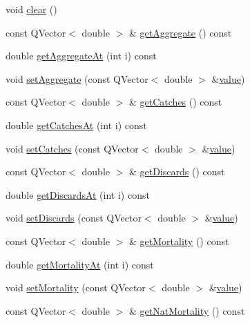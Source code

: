 \begin{DoxyCompactItemize}
\item 
void \mbox{\hyperlink{class_population_data_a37293ee09cf8bad0702f0ab9a16119aa}{clear}} ()
\item 
const Q\+Vector$<$ double $>$ \& \mbox{\hyperlink{class_population_data_ad9a26b5244fa9a093ed7ef7127b6dd5b}{get\+Aggregate}} () const
\item 
double \mbox{\hyperlink{class_population_data_aa40d72ba5f1d6729d1eff55a39961493}{get\+Aggregate\+At}} (int i) const
\item 
void \mbox{\hyperlink{class_population_data_ae4564a189ea27190e5437ea1bd8a9dcb}{set\+Aggregate}} (const Q\+Vector$<$ double $>$ \&\mbox{\hyperlink{diffusion_8cpp_a4b41795815d9f3d03abfc739e666d5da}{value}})
\item 
const Q\+Vector$<$ double $>$ \& \mbox{\hyperlink{class_population_data_a7ef29dd6225298f9d68b8e58f3463313}{get\+Catches}} () const
\item 
double \mbox{\hyperlink{class_population_data_aa79ab667768a1a78049251a01f8af5eb}{get\+Catches\+At}} (int i) const
\item 
void \mbox{\hyperlink{class_population_data_a04cd2bba84aa9b7d94d1fb959124fa17}{set\+Catches}} (const Q\+Vector$<$ double $>$ \&\mbox{\hyperlink{diffusion_8cpp_a4b41795815d9f3d03abfc739e666d5da}{value}})
\item 
const Q\+Vector$<$ double $>$ \& \mbox{\hyperlink{class_population_data_a99700b0eb7d8724af631d923bccd8973}{get\+Discards}} () const
\item 
double \mbox{\hyperlink{class_population_data_a2ac9a9412cd3115556d05d5b1d3f7a9a}{get\+Discards\+At}} (int i) const
\item 
void \mbox{\hyperlink{class_population_data_a9ec738d591293865c7e2f5983e43cf59}{set\+Discards}} (const Q\+Vector$<$ double $>$ \&\mbox{\hyperlink{diffusion_8cpp_a4b41795815d9f3d03abfc739e666d5da}{value}})
\item 
const Q\+Vector$<$ double $>$ \& \mbox{\hyperlink{class_population_data_a4eea19254a4d42202e250307d3ea768c}{get\+Mortality}} () const
\item 
double \mbox{\hyperlink{class_population_data_a6134712a38d67bb74fbc3d277a1945ab}{get\+Mortality\+At}} (int i) const
\item 
void \mbox{\hyperlink{class_population_data_a8bd49759a0cf33b3954cb51633d7eded}{set\+Mortality}} (const Q\+Vector$<$ double $>$ \&\mbox{\hyperlink{diffusion_8cpp_a4b41795815d9f3d03abfc739e666d5da}{value}})
\item 
const Q\+Vector$<$ double $>$ \& \mbox{\hyperlink{class_population_data_a3a78a4b8a8a893bc753a155adc83341a}{get\+Nat\+Mortality}} () const

\end{DoxyCompactItemize}

